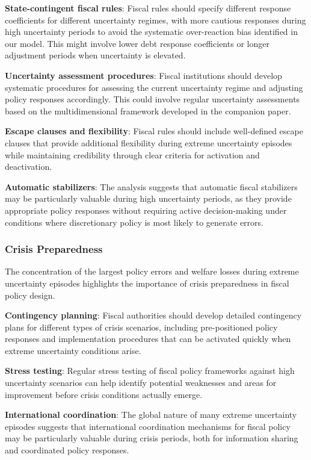 \documentclass[5p,authoryear]{elsarticle}
\begin{document}
\textbf{State-contingent fiscal rules}: Fiscal rules should specify different response coefficients for different uncertainty regimes, with more cautious responses during high uncertainty periods to avoid the systematic over-reaction bias identified in our model. This might involve lower debt response coefficients or longer adjustment periods when uncertainty is elevated.

\textbf{Uncertainty assessment procedures}: Fiscal institutions should develop systematic procedures for assessing the current uncertainty regime and adjusting policy responses accordingly. This could involve regular uncertainty assessments based on the multidimensional framework developed in the companion paper.

\textbf{Escape clauses and flexibility}: Fiscal rules should include well-defined escape clauses that provide additional flexibility during extreme uncertainty episodes while maintaining credibility through clear criteria for activation and deactivation.

\textbf{Automatic stabilizers}: The analysis suggests that automatic fiscal stabilizers may be particularly valuable during high uncertainty periods, as they provide appropriate policy responses without requiring active decision-making under conditions where discretionary policy is most likely to generate errors.

\subsubsection{Crisis Preparedness}

The concentration of the largest policy errors and welfare losses during extreme uncertainty episodes highlights the importance of crisis preparedness in fiscal policy design.

\textbf{Contingency planning}: Fiscal authorities should develop detailed contingency plans for different types of crisis scenarios, including pre-positioned policy responses and implementation procedures that can be activated quickly when extreme uncertainty conditions arise.

\textbf{Stress testing}: Regular stress testing of fiscal policy frameworks against high uncertainty scenarios can help identify potential weaknesses and areas for improvement before crisis conditions actually emerge.

\textbf{International coordination}: The global nature of many extreme uncertainty episodes suggests that international coordination mechanisms for fiscal policy may be particularly valuable during crisis periods, both for information sharing and coordinated policy responses.
\end{document}
